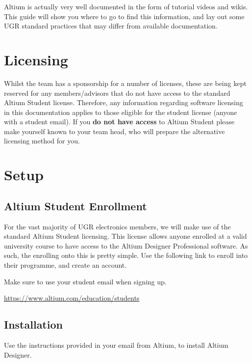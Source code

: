 Altium is actually very well documented in the form of tutorial videos and wikis. This guide will show you where to go to find this information, and lay out some UGR standard practices that may differ from available documentation.

\section{Licensing}
Whilst the team has a sponsorship for a number of licenses, these are being kept reserved for any members/advisors that do not have access to the standard Altium Student license. Therefore, any information regarding software licensing in this documentation applies to those eligible for the student license (anyone with a student email). If you \textbf{do not have access} to Altium Student please make yourself known to your team head, who will prepare the alternative licensing method for you.

\newpage
\section{Setup}

\subsection{Altium Student Enrollment}
For the vast majority of UGR electronics members, we will make use of the standard Altium Student licensing. This license allows anyone enrolled at a valid university course to have access to the Altium Designer Professional software. As such, the enrolling onto this is pretty simple. Use the following link to enroll into their programme, and create an account. 

\begin{note}
Make sure to use your student email when signing up.
\end{note}

\begin{minipage}{\textwidth}
\centering
\href{https://www.altium.com/education/students}{https://www.altium.com/education/students}
\end{minipage}

\subsection{Installation}
Use the instructions provided in your email from Altium, to install Altium Designer.\\

